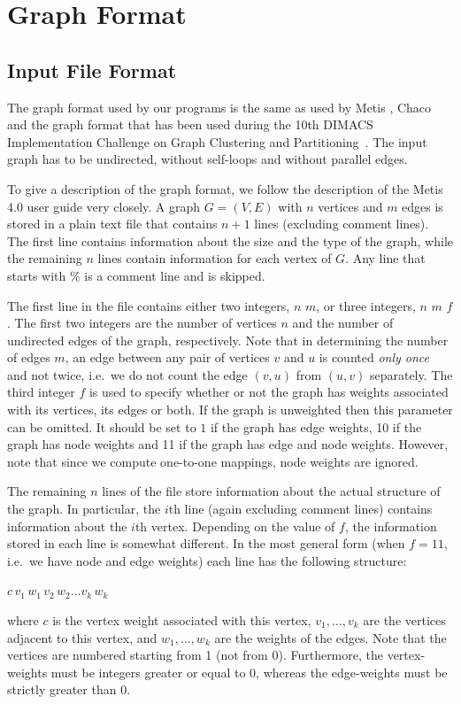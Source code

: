 \documentclass[11pt]{article}
\newcommand{\ie}{i.e.\ }
\begin{document}
\section{Graph Format}
\label{ss:graphformat}
\subsection{Input File Format}
The graph format used by our programs is the same as used by Metis \cite{karypis1998fast}, Chaco \cite{chaco} and the graph format that has been used during the 10th DIMACS Implementation Challenge on Graph Clustering and Partitioning~\cite{benchmarksfornetworksanalysis}. 
The input graph has to be undirected, without self-loops and without parallel edges.

To give a description of the graph format, we follow the description of the Metis 4.0 user guide very closely. A graph $G=(V,E)$ with $n$ vertices and $m$ edges is stored in a plain text file that contains $n+1$ lines (excluding comment lines). The first line contains information about the size and the type of the graph, while the remaining $n$ lines contain information for each vertex of $G$. Any line that starts with \% is a comment line and is skipped.

The first line in the file contains either two integers, $n$ $m$, or three integers, $n$ $m$ $f$. The first two integers are the number of vertices $n$ and the number of undirected edges of the graph, respectively. Note that in determining the number of edges $m$, an edge between any pair of vertices $v$ and $u$ is counted \emph{only once} and not twice, \ie we do not count the edge $(v,u)$ from $(u,v)$ separately. The third integer $f$ is used to specify whether or not the graph has weights associated with its vertices, its edges or both. If the graph is unweighted then this parameter can be omitted. It should be set to $1$ if the graph has edge weights, 10 if the graph has node weights and 11 if the graph has edge and node weights. However, note that since we compute one-to-one mappings, node weights are ignored.

The remaining $n$ lines of the file store information about the actual structure of the graph. In particular, the $i$th line (again excluding comment lines) contains information about the $i$th vertex. Depending on the value of $f$, the information stored in each line is somewhat different. In the most general form (when $f=11$, \ie we have node and edge weights) each line has the following structure:
\begin{center}
       $c\, v_1\, w_1\, v_2\, w_2 \ldots v_k\, w_k$ 
\end{center}
where $c$ is the vertex weight associated with this vertex, $v_1, \ldots, v_k$ are the vertices adjacent to this vertex, and $w_1, \ldots, w_k$ are the weights of the edges. Note that the vertices are numbered starting from 1 (not from 0). Furthermore, the vertex-weights must be integers greater or equal to 0, whereas the edge-weights must be strictly greater than 0.
\end{document}
